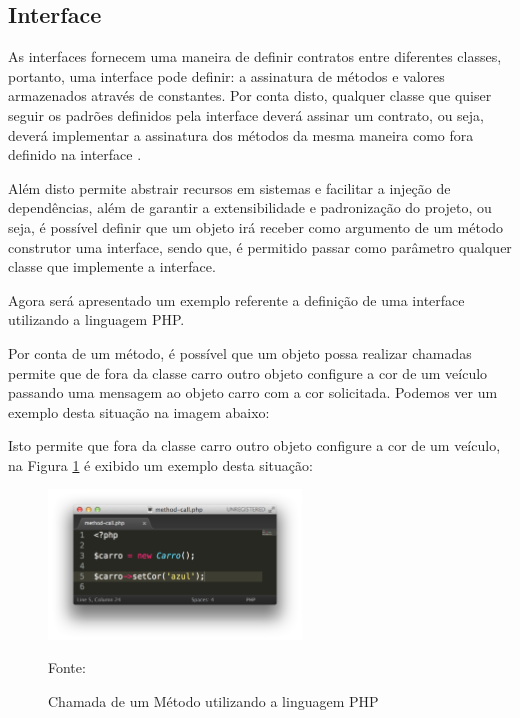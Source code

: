 \subsection{Interface}

As interfaces fornecem uma maneira de definir contratos entre diferentes
classes, portanto, uma interface pode definir: a assinatura de métodos e
valores armazenados através de constantes. Por conta disto, qualquer classe  que
quiser seguir os padrões definidos pela interface deverá assinar um contrato,
ou seja, deverá implementar a assinatura dos métodos da mesma maneira como  fora
definido na interface \cite{programmingPhp}.

Além disto permite abstrair recursos em sistemas e facilitar a
injeção de dependências, além de garantir a extensibilidade e padronização do
projeto, ou seja, é possível definir que um objeto irá receber como argumento de
um método construtor uma interface, sendo que, é permitido passar como parâmetro
qualquer classe que implemente a interface.

Agora será apresentado um exemplo referente a definição de uma interface
utilizando a linguagem PHP.







Por conta de um método, é possível que um objeto possa realizar chamadas 
permite que de fora da classe carro outro objeto configure a cor de um veículo passando uma mensagem ao objeto carro com a cor solicitada. Podemos ver
um exemplo desta situação na imagem abaixo:


Isto permite que fora da classe carro outro objeto configure a cor de um
veículo, na Figura \ref{fig:chamadaMetodo} é exibido um exemplo desta
situação:


\begin{figure}[h!tb]
	\caption{Chamada de um Método utilizando a linguagem PHP}
	\label{fig:chamadaMetodo}

	\centering
	\includegraphics[width=0.6\textwidth]{images/method-call.png}

	\centering
	\footnotesize Fonte: \fonteOAutor
\end{figure}

